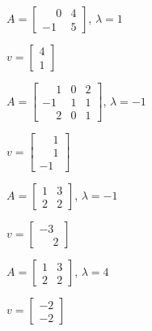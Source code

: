\documentclass[12pt]{exam}
\begin{document}
\begin{exercicio}
    $A = \begin{bmatrix}\phantom{-}0 & 4\\-1 & 5\end{bmatrix}$, $\lambda = 1$
    \begin{solucao}
        $v = \begin{bmatrix}4\\1\end{bmatrix}$
    \end{solucao}
\end{exercicio}

\begin{exercicio}
    $A = \begin{bmatrix}\phantom{-}1 & 0 & 2\\-1 & 1 & 1\\\phantom{-}2 & 0 & 1\end{bmatrix}$, $\lambda = -1$
    \begin{solucao}
        $v = \begin{bmatrix}\phantom{-}1\\\phantom{-}1\\-1\end{bmatrix}$
    \end{solucao}
\end{exercicio}

\begin{exercicio}
    $A = \begin{bmatrix}1 & 3\\2 & 2\end{bmatrix}$, $\lambda = -1$
    \begin{solucao}
        $v = \begin{bmatrix}-3\\\phantom{-}2\end{bmatrix}$
    \end{solucao}
\end{exercicio}

\begin{exercicio}
    $A = \begin{bmatrix}1 & 3\\2 & 2\end{bmatrix}$, $\lambda = 4$
    \begin{solucao}
        $v = \begin{bmatrix}-2\\-2\end{bmatrix}$
    \end{solucao}
\end{exercicio}
\end{document}
